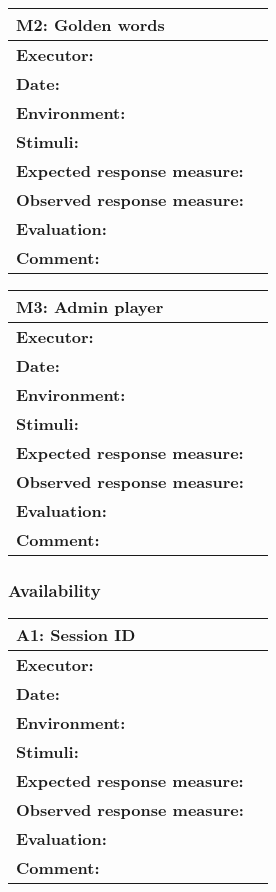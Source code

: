 \begin{tabular}{|m{}||m{}|}
\hline
\multicolumn{2}{|l|}{M2: Golden words} \\ \hline
\textbf{Executor:} & \\ \hline
\textbf{Date:} & \\ \hline
\textbf{Environment:} & \\ \hline
\textbf{Stimuli:} & \\ \hline
\textbf{Expected response measure:} & \\ \hline
\textbf{Observed response measure:} & \\ \hline
\textbf{Evaluation:} & \\ \hline
\textbf{Comment:} & \\ \hline
\end{tabular}

\begin{tabular}{|m{}||m{}|}
\hline
\multicolumn{2}{|l|}{M3: Admin player} \\ \hline
\textbf{Executor:} & \\ \hline
\textbf{Date:} & \\ \hline
\textbf{Environment:} & \\ \hline
\textbf{Stimuli:} & \\ \hline
\textbf{Expected response measure:} & \\ \hline
\textbf{Observed response measure:} & \\ \hline
\textbf{Evaluation:} & \\ \hline
\textbf{Comment:} & \\ \hline
\end{tabular}


\subsubsection{Availability}

\begin{tabular}{|m{}||m{}|}
\hline
\multicolumn{2}{|l|}{A1: Session ID} \\ \hline
\textbf{Executor:} & \\ \hline
\textbf{Date:} & \\ \hline
\textbf{Environment:} & \\ \hline
\textbf{Stimuli:} & \\ \hline
\textbf{Expected response measure:} & \\ \hline
\textbf{Observed response measure:} & \\ \hline
\textbf{Evaluation:} & \\ \hline
\textbf{Comment:} & \\ \hline
\end{tabular}


